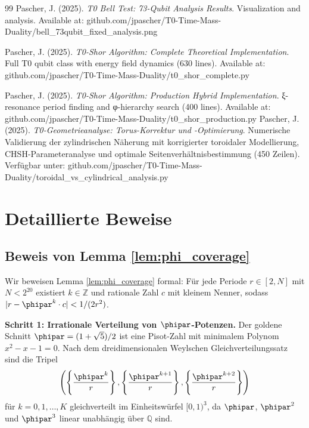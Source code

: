 \begin{thebibliography}{99}
	Pascher, J. (2025). 
	\textit{T0 Bell Test: 73-Qubit Analysis Results}. 
	Visualization and analysis. Available at: github.com/jpascher/T0-Time-Mass-Duality/bell\_73qubit\_fixed\_analysis.png
	
	Pascher, J. (2025). 
	\textit{T0-Shor Algorithm: Complete Theoretical Implementation}. 
	Full T0 qubit class with energy field dynamics (630 lines). Available at: github.com/jpascher/T0-Time-Mass-Duality/t0\_shor\_complete.py
	
	Pascher, J. (2025). 
	\textit{T0-Shor Algorithm: Production Hybrid Implementation}. 
	ξ-resonance period finding and φ-hierarchy search (400 lines). Available at: github.com/jpascher/T0-Time-Mass-Duality/t0\_shor\_production.py
	Pascher, J. (2025). 
	\textit{T0-Geometrieanalyse: Torus-Korrektur und -Optimierung}. 
	Numerische Validierung der zylindrischen Näherung mit korrigierter toroidaler Modellierung, CHSH-Parameteranalyse und optimale Seitenverhältnisbestimmung (450 Zeilen). Verfügbar unter: github.com/jpascher/T0-Time-Mass-Duality/toroidal\_vs\_cylindrical\_analysis.py
\end{thebibliography}

\appendix

\section{Detaillierte Beweise}
\label{app:proofs}

\subsection{Beweis von Lemma \ref{lem:phi_coverage}}
\label{app:proof_phi_coverage}

Wir beweisen Lemma \ref{lem:phi_coverage} formal: Für jede Periode $r \in [2, N]$ mit $N < 2^{20}$ existiert $k \in \mathbb{Z}$ und rationale Zahl $c$ mit kleinem Nenner, sodass $|r - \phipar^k \cdot c| < 1/(2r^2)$.

\textbf{Schritt 1: Irrationale Verteilung von $\phipar$-Potenzen.}
Der goldene Schnitt $\phipar = (1+\sqrt{5})/2$ ist eine Pisot-Zahl mit minimalem Polynom $x^2 - x - 1 = 0$. Nach dem dreidimensionalen Weylschen Gleichverteilungssatz sind die Tripel
\[
\left(\left\{\frac{\phipar^k}{r}\right\}, \left\{\frac{\phipar^{k+1}}{r}\right\}, \left\{\frac{\phipar^{k+2}}{r}\right\}\right)
\]
für $k = 0, 1, \ldots, K$ gleichverteilt im Einheitswürfel $[0,1)^3$, da $\phipar$, $\phipar^2$ und $\phipar^3$ linear unabhängig über $\mathbb{Q}$ sind.

